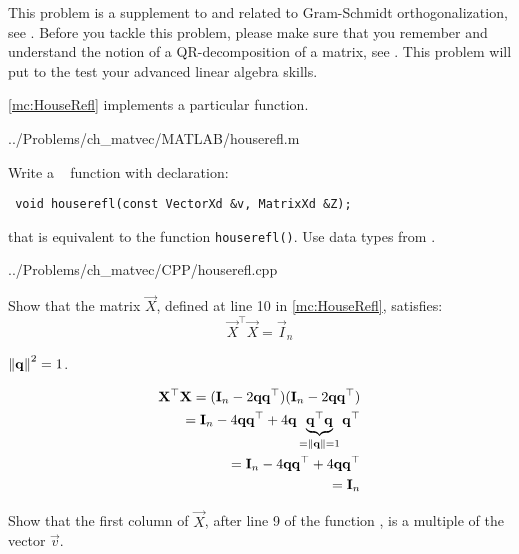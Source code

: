 \renewcommand{\chpt}{ch_matvec}

\begin{problem} \label{prb:HouseRefl} This problem is a
  supplement to  and related to Gram-Schmidt orthogonalization, see
  .  Before you tackle this problem, please make sure that you
  remember and understand the notion of a QR-decomposition of a matrix, see
  . This problem will put to the test your advanced linear algebra
  skills.


  \begin{subproblem}[3]\label{subprb:HouseRefl_0}
    \cref{mc:HouseRefl} implements a particular \matlab{} function.
    

    
    {../Problems/ch_matvec/MATLAB/houserefl.m}

    Write a \Cpp~ function with declaration:
\begin{verbatim}
 void houserefl(const VectorXd &v, MatrixXd &Z);
\end{verbatim}
    that is equivalent to the \matlab{} function \texttt{houserefl()}. 
    Use data types from \eigen{}. 

    \begin{solution}
%

{../Problems/ch_matvec/CPP/houserefl.cpp}
    \end{solution}
  \end{subproblem}
  
%
\begin{subproblem}[3] \label{subprb:HouseRefl_a}
 Show that the matrix $\vec{X}$,  defined at line 10 in \autoref{mc:HouseRefl}, satisfies:
 \[
  \vec{X}^\top \vec{X} = \vec{I}_n
 \]
 \begin{hint}
  $\left\lVert \mathbf{q} \right\rVert^2 = 1$.
 \end{hint}
 
 \begin{solution}
  \begin{align*}
  \mathbf{X}^\top \mathbf{X} = (\mathbf{I}_n - 2 \mathbf{q}\mathbf{q}^\top)(\mathbf{I}_n - 2 \mathbf{q}\mathbf{q}^\top) \\
   = \mathbf{I}_n - 4 \mathbf{q}\mathbf{q}^\top + 4 \mathbf{q} \underbrace{\mathbf{q}^\top\mathbf{q}}_{=\left\lVert \mathbf{q} \right\rVert=1}\mathbf{q}^\top \\
   = \mathbf{I}_n - 4 \mathbf{q}\mathbf{q}^\top + 4 \mathbf{q}\mathbf{q}^\top \\
   = \mathbf{I}_n 
  \end{align*}
 \end{solution}
\end{subproblem}
%
\begin{subproblem}[4] \label{subprb:HouseRefl_b}
 Show that the first column of $\vec{X}$, after line 9 of the function , is a multiple of the vector $\vec{v}$.
 

\end{subproblem}
\end{problem}

